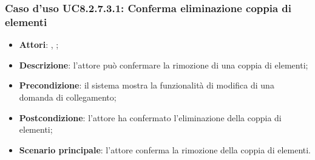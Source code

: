 		\subsubsection{Caso d'uso UC8.2.7.3.1: Conferma eliminazione coppia di elementi}
		\label{UC8.2.7.3.1}
		\begin{itemize}
			\item \textbf{Attori}: \uau, \uaupro;
			\item \textbf{Descrizione}: l'attore può confermare la rimozione di una coppia di elementi;
			\item \textbf{Precondizione}: il sistema mostra la funzionalità di modifica di una domanda di collegamento; 
			\item \textbf{Postcondizione}: l'attore ha confermato l'eliminazione della coppia di elementi;
			\item \textbf{Scenario principale}: l'attore conferma la rimozione della coppia di elementi.
		\end{itemize}


